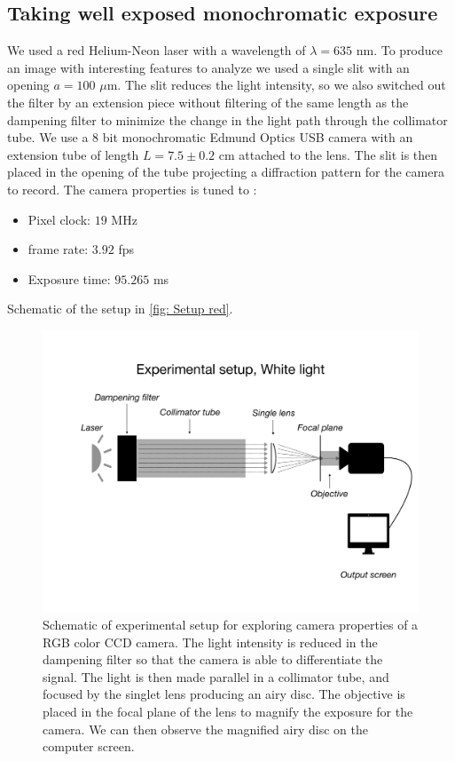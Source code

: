 \documentclass{emulateapj}
\begin{document}
\subsection{Taking well exposed monochromatic exposure}
\label{subsec: Data/mono CCD}
We used a red Helium-Neon laser with a wavelength of $\lambda = 635$ nm. To produce an image with interesting features to analyze we used a single slit with an opening $a = 100$ $\mu$m. The slit reduces the light intensity, so we also switched out the filter by an extension piece without filtering of the same length as the dampening filter to minimize the change in the light path through the collimator tube. We use a 8 bit monochromatic Edmund Optics USB camera with an extension tube of length $L = 7.5 \pm 0.2$ cm attached to the lens. The slit is then placed in the opening of the tube projecting a diffraction pattern for the camera to record. 
The camera properties is tuned to :
\begin{itemize}
\item Pixel clock: $19$ MHz
\item frame rate: $3.92$ fps
\item Exposure time: $95.265$ ms
\end{itemize}
Schematic of the setup in \cref{fig: Setup red}.

\begin{figure}
	\centering
	\includegraphics[width=\linewidth]{./keynotes/exp_setup_white.pdf}
	\caption[Experimental setup white light]{Schematic of experimental setup for exploring camera properties of a RGB color CCD camera. The light intensity is reduced in the dampening filter so that the camera is able to differentiate the signal. The light is then made parallel in a collimator tube, and focused by the singlet lens producing an airy disc. The objective is placed in the focal plane of the lens to magnify the exposure for the camera. We can then observe the magnified airy disc on the computer screen.}
	\label{fig: Setup white}
\end{figure}
\end{document}
